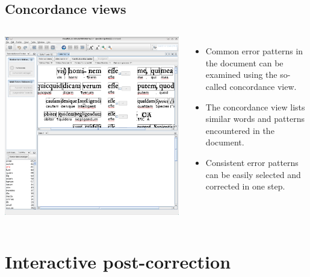 \subsection{Concordance views}
\begin{frame}
	\begin{columns}
		\includegraphics[height=.8\textheight]{../presentations/images/konkordanz_1.png}
		\begin{itemize}
			\item Common error patterns in the document can be examined using
				the so-called concordance view.
			\item The concordance view lists similar words and patterns
				encountered in the document.
			\item Consistent error patterns can be easily selected and
				corrected in one step.
		\end{itemize}
	\end{columns}
\end{frame}

\section{Interactive post-correction}
